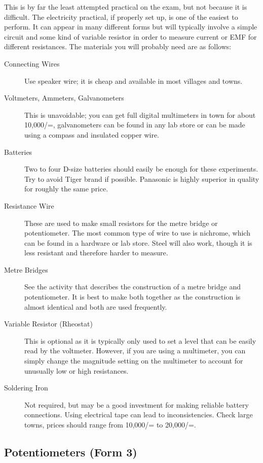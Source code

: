 This is by far the least attempted practical on the exam, but not because it is
difficult. The electricity practical, if properly set up, is one of the easiest to perform. It
can appear in many different forms but will typically involve a simple circuit and some
kind of variable resistor in order to measure current or EMF for different resistances. The
materials you will probably need are as follows:

\begin{description}
\item[Connecting Wires]{Use speaker wire; it is cheap and available in most villages
and towns.}
\item[Voltmeters, Ammeters, Galvanometers]{This is unavoidable; you can get full
digital multimeters in town for about 10,000/=, galvanometers can be found in
any lab store or can be made using a compass and insulated copper wire.}
\item[Batteries]{Two to four D-size batteries should easily be enough for these experiments. Try to avoid Tiger brand if possible. Panasonic is highly superior in quality for roughly the same price.}
\item[Resistance Wire]{These are used to make small resistors for
the metre bridge or potentiometer. The most common type of wire to use is
nichrome, which can be found in a hardware or lab store. Steel will also work, though it
is less resistant and therefore harder to measure.}
\item[Metre Bridges]{See the activity that describes the construction of a metre bridge
and potentiometer. It is best to make both together as the construction is almost
identical and both are used frequently.}
\item[Variable Resistor (Rheostat)]{This is optional as it is typically only used to set a
level that can be easily read by the voltmeter. However, if you are using a
multimeter, you can simply change the magnitude setting on the multimeter to
account for unusually low or high resistances.}
\item[Soldering Iron]{Not required, but may be a good investment for making reliable battery connections. Using electrical tape can lead to inconsistencies. Check large towns, prices should range from 10,000/= to 20,000/=.}
\end{description}

\subsection{Potentiometers (Form 3)}


